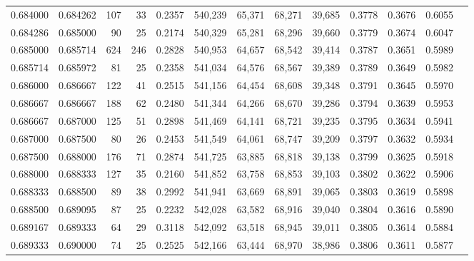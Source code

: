\begin{tabular}{rrrrrrrrrrrrr}
0.684000 & 0.684262 &   107 &  33 &                                     0.2357 & 540,239 &  65,371 &  68,271 &  39,685 & 0.3778 & 0.3676 & 0.6055 \\
0.684286 & 0.685000 &    90 &  25 &                                     0.2174 & 540,329 &  65,281 &  68,296 &  39,660 & 0.3779 & 0.3674 & 0.6047 \\
0.685000 & 0.685714 &   624 & 246 &                                     0.2828 & 540,953 &  64,657 &  68,542 &  39,414 & 0.3787 & 0.3651 & 0.5989 \\
0.685714 & 0.685972 &    81 &  25 &                                     0.2358 & 541,034 &  64,576 &  68,567 &  39,389 & 0.3789 & 0.3649 & 0.5982 \\
0.686000 & 0.686667 &   122 &  41 &                                     0.2515 & 541,156 &  64,454 &  68,608 &  39,348 & 0.3791 & 0.3645 & 0.5970 \\
0.686667 & 0.686667 &   188 &  62 &                                     0.2480 & 541,344 &  64,266 &  68,670 &  39,286 & 0.3794 & 0.3639 & 0.5953 \\
0.686667 & 0.687000 &   125 &  51 &                                     0.2898 & 541,469 &  64,141 &  68,721 &  39,235 & 0.3795 & 0.3634 & 0.5941 \\
0.687000 & 0.687500 &    80 &  26 &                                     0.2453 & 541,549 &  64,061 &  68,747 &  39,209 & 0.3797 & 0.3632 & 0.5934 \\
0.687500 & 0.688000 &   176 &  71 &                                     0.2874 & 541,725 &  63,885 &  68,818 &  39,138 & 0.3799 & 0.3625 & 0.5918 \\
0.688000 & 0.688333 &   127 &  35 &                                     0.2160 & 541,852 &  63,758 &  68,853 &  39,103 & 0.3802 & 0.3622 & 0.5906 \\
0.688333 & 0.688500 &    89 &  38 &                                     0.2992 & 541,941 &  63,669 &  68,891 &  39,065 & 0.3803 & 0.3619 & 0.5898 \\
0.688500 & 0.689095 &    87 &  25 &                                     0.2232 & 542,028 &  63,582 &  68,916 &  39,040 & 0.3804 & 0.3616 & 0.5890 \\
0.689167 & 0.689333 &    64 &  29 &                                     0.3118 & 542,092 &  63,518 &  68,945 &  39,011 & 0.3805 & 0.3614 & 0.5884 \\
0.689333 & 0.690000 &    74 &  25 &                                     0.2525 & 542,166 &  63,444 &  68,970 &  38,986 & 0.3806 & 0.3611 & 0.5877 \\

\end{tabular}
